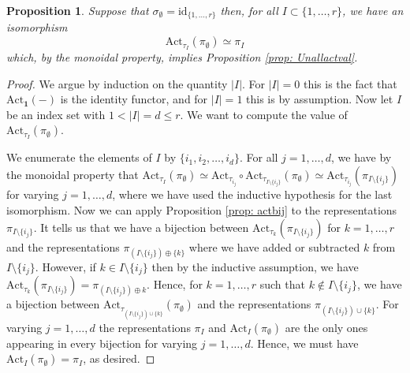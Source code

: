 \documentclass[reqno,11pt]{amsart}
\newtheorem{proposition}[theorem]{Proposition}
\theoremstyle{remark}
\newcommand{\Act}{\mathrm{Act}}
\begin{document}
\begin{proposition}
Suppose that $\sigma_{\emptyset} = \mathrm{id}_{\{1,\ldots,r\}}$ then, for all $I \subset \{1,\ldots,r\}$, we have an isomorphism
\[ \Act_{\tau_{I}}(\pi_{\emptyset}) \simeq \pi_{I} \]
which, by the monoidal property, implies Proposition \ref{prop: Unallactval}. 
\end{proposition}
\begin{proof}
We argue by induction on the quantity $|I|$. For $|I| = 0$ this is the fact that $\Act_{\mathbf{1}}(-)$ is the identity functor, and for $|I| = 1$ this is by assumption. Now let $I$ be an index set with $1 < |I| = d \leq r$. We want to compute the value of $\Act_{\tau_{I}}(\pi_{\emptyset})$.

We enumerate the elements of $I$ by $\{i_{1},i_{2},\ldots,i_{d}\}$. For all $j = 1,\ldots,d$, we have by the monoidal property that $\Act_{\tau_{I}}(\pi_{\emptyset}) \simeq \Act_{\tau_{i_{j}}} \circ \Act_{\tau_{I \setminus \{i_{j}\}}}(\pi_{\emptyset}) \simeq \Act_{\tau_{i_{j}}}(\pi_{I \setminus \{i_{j}\}})$ for varying $j = 1,\ldots,d$, where we have used the inductive hypothesis for the last isomorphism. Now we can apply Proposition \ref{prop: actbij} to the representations $\pi_{I \setminus \{i_{j}\}}$. It tells us that we have a bijection between $\Act_{\tau_{k}}(\pi_{I \setminus \{i_{j}\}})$ for $k = 1,\ldots,r$ and the representations $\pi_{(I \setminus \{i_{j}\}) \oplus \{k\}}$ where we have added or subtracted $k$ from $I \setminus \{i_{j}\}$. However, if $k \in I \setminus \{i_j\}$ then by the inductive assumption, we have $\Act_{\tau_k}(\pi_{I \setminus \{i_j\}}) = \pi_{(I \setminus \{i_j\}) \oplus k}$. Hence, for $k = 1,\ldots,r$ such that $k \notin I \setminus \{i_{j}\}$, we have a bijection between $\Act_{\tau_{(I \setminus \{i_{j}\}) \cup \{k\}}}(\pi_{\emptyset})$ and the representations $\pi_{(I \setminus \{i_{j}\}) \cup \{k\}}$. For varying $j = 1,\ldots,d$ the representations $\pi_I$ and $\Act_I(\pi_{\emptyset})$ are the only ones appearing in every bijection for varying $j = 1,\ldots,d$. Hence, we must have $\Act_I(\pi_{\emptyset})=\pi_I$, as desired. 
\end{proof}
\end{document}
